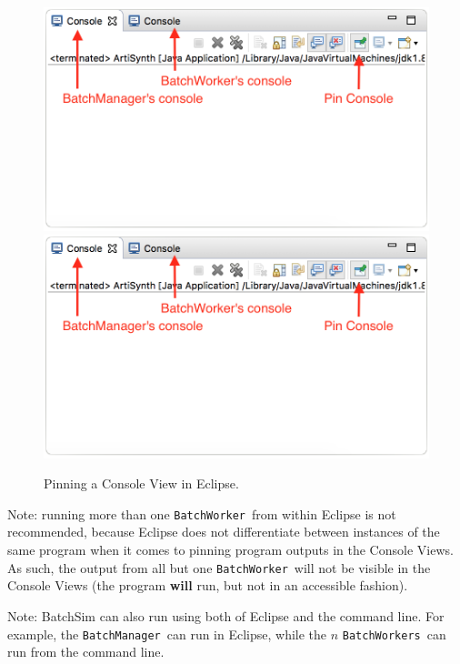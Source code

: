 \documentclass{article}
\newcommand{\BM}{{\tt BatchManager}}
\newcommand{\BW}{{\tt BatchWorker}}
\newcommand{\BWs}{{\tt BatchWorkers}}
\begin{document}
\begin{figure}[t]
\begin{center}
\iflatexml
 \includegraphics[]{images/batch-worker-launch-2}
\else
 \includegraphics[width=6in]{images/batch-worker-launch-2}
\fi
\end{center}
\caption{Pinning a Console View in Eclipse.}
\label{fig:pin-console}
\end{figure}

\begin{sideblock}
Note: running more than one \BW\ from within Eclipse is not recommended, because Eclipse does not differentiate between instances of the same program when it comes to pinning program outputs in the Console Views. As such, the output from all but one \BW\ will not be visible in the Console Views (the program \textbf{will} run, but not in an accessible fashion). 
\end{sideblock}

\begin{sideblock}
Note: BatchSim can also run using both of Eclipse and the command line. For example, the \BM\ can run in Eclipse, while the $n$ \BWs\ can run from the command line.
\end{sideblock}
\end{document}
